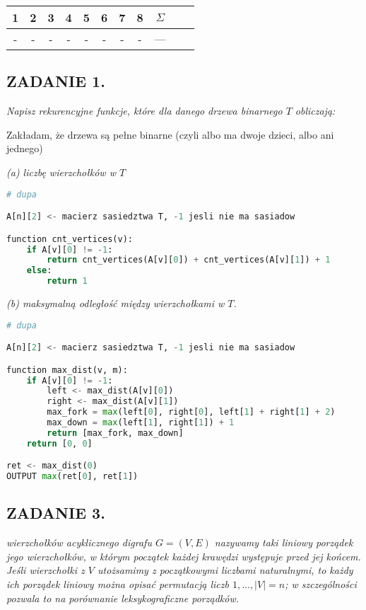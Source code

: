 \documentclass{article}
\begin{document}
\begin{center}\begin{tabular}{| c | c | c | c | c | c | c | c | c | c | c |}
    \hline

    1 & 2 & 3 & 4 & 5 & 6 & 7 & 8 & $\Sigma$\\

    \hline

    - & - & - & - & - & - & - & - & ---\\

    \hline
\end{tabular}\end{center}

\subsection*{ZADANIE 1.}
\emph{Napisz rekurencyjne funkcje, które dla danego drzewa binarnego $T$ obliczają:}

Zakładam, że drzewa są pełne binarne (czyli albo ma dwoje dzieci, albo ani jednego)

\emph{(a) liczbę wierzchołków w $T$}

\begin{lstlisting}[language=Python]
# dupa

A[n][2] <- macierz sasiedztwa T, -1 jesli nie ma sasiadow

function cnt_vertices(v):
    if A[v][0] != -1:
        return cnt_vertices(A[v][0]) + cnt_vertices(A[v][1]) + 1
    else:
        return 1
\end{lstlisting}

\emph{(b) maksymalną odległość między wierzchołkami w $T$.}

\begin{lstlisting}[language=Python]
# dupa

A[n][2] <- macierz sasiedztwa T, -1 jesli nie ma sasiadow

function max_dist(v, m):
    if A[v][0] != -1:
        left <- max_dist(A[v][0])
        right <- max_dist(A[v][1])
        max_fork = max(left[0], right[0], left[1] + right[1] + 2)
        max_down = max(left[1], right[1]) + 1
        return [max_fork, max_down]
    return [0, 0]

ret <- max_dist(0)
OUTPUT max(ret[0], ret[1])
\end{lstlisting}

\subsection*{ZADANIE 3.}
\emph{ wierzchołków acyklicznego digrafu $G=(V, E)$ nazywamy taki liniowy porządek jego wierzchołków, w którym początek każdej krawędzi występuje przed jej końcem. Jeśli wierzchołki z $V$ utożsamimy z początkowymi liczbami naturalnymi, to każdy ich porządek liniowy można opisać permutacją liczb $1,...,|V|=n$; w szczególności pozwala to na porównanie leksykograficzne porządków.}
\end{document}
